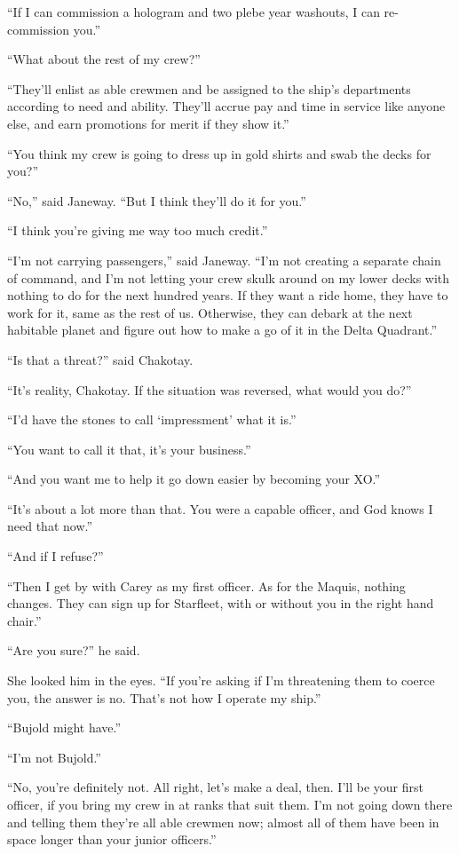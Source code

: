\documentclass[twoside,letterpaper,12pt]{memoir}
\begin{document}
``If I can commission a hologram and two plebe year washouts, I can re-commission you.'' 

``What about the rest of my crew?'' 

``They’ll enlist as able crewmen and be assigned to the ship’s departments according to need and ability. They’ll accrue pay and time in service like anyone else, and earn promotions for merit if they show it.'' 

``You think my crew is going to dress up in gold shirts and swab the decks for you?'' 

``No,'' said Janeway. ``But I think they’ll do it for you.'' 

``I think you’re giving me way too much credit.'' 

``I’m not carrying passengers,'' said Janeway. ``I’m not creating a separate chain of command, and I’m not letting your crew skulk around on my lower decks with nothing to do for the next hundred years. If they want a ride home, they have to work for it, same as the rest of us. Otherwise, they can debark at the next habitable planet and figure out how to make a go of it in the Delta Quadrant.'' 

``Is that a threat?'' said Chakotay. 

``It’s reality, Chakotay. If the situation was reversed, what would you do?'' 

``I’d have the stones to call ‘impressment’ what it is.'' 

``You want to call it that, it’s your business.'' 

``And you want me to help it go down easier by becoming your XO.'' 

``It’s about a lot more than that. You were a capable officer, and God knows I need that now.'' 

``And if I refuse?'' 

``Then I get by with Carey as my first officer. As for the Maquis, nothing changes. They can sign up for Starfleet, with or without you in the right hand chair.'' 

``Are you sure?'' he said. 

She looked him in the eyes. ``If you’re asking if I’m threatening them to coerce you, the answer is no. That’s not how I operate my ship.'' 

``Bujold might have.'' 

``I’m not Bujold.'' 

``No, you’re definitely not. All right, let’s make a deal, then. I’ll be your first officer, if you bring my crew in at ranks that suit them. I’m not going down there and telling them they’re all able crewmen now; almost all of them have been in space longer than your junior officers.'' 
\end{document}
